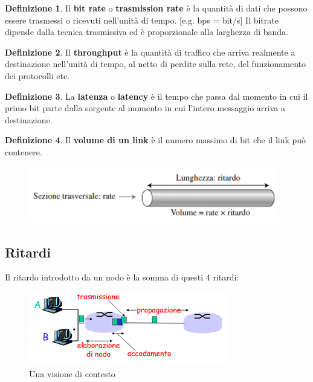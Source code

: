\documentclass[11pt,a4paper,oneside]{book}
\theoremstyle{definition}
\newtheorem{definition}{Definizione}[section]
\begin{document}
\theoremstyle{definition}
\begin{definition}
	Il \textbf{bit rate} o \textbf{trasmission rate} è la quantità di dati che possono essere trasmessi o ricevuti nell'unità di tempo. [e.g. bps = bit/s]\newline
	Il bitrate dipende dalla tecnica trasmissiva ed è proporzionale alla larghezza di banda.
\end{definition}

\theoremstyle{definition}
\begin{definition}
	Il \textbf{throughput} è la quantità di traffico che arriva realmente a destinazione nell'unità di tempo, al netto di perdite sulla rete,
	del funzionamento dei protocolli etc.
\end{definition}

\theoremstyle{definition}
\begin{definition}
	La \textbf{latenza} o \textbf{latency} è il tempo che passa dal momento in cui il primo bit parte dalla sorgente al momento in cui l'intero messaggio arriva a destinazione.
	\begin{center}
	\end{center}
\end{definition}

\theoremstyle{definition}
\begin{definition}
	Il \textbf{volume di un link} è il numero massimo di bit che il link può contenere.
\end{definition}

{\centering{} \par}

\begin{figure}[!h]
	\includegraphics[scale=0.5]{Immagini/Link_Volume.png}
	\centering
\end{figure}

\pagebreak

\subsection{Ritardi}
Il ritardo introdotto da un nodo è la somma di questi 4 ritardi:
\begin{figure}[!h]
	\includegraphics[scale=0.7]{Immagini/Ritardi.png}
	\centering
	\caption{Una visione di contesto}
\end{figure}
\end{document}
